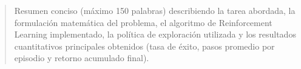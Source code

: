 \begin{abstract}
    Resumen conciso (máximo 150 palabras) describiendo la tarea abordada, la formulación matemática del problema, el algoritmo de Reinforcement Learning implementado, la política de exploración utilizada y los resultados cuantitativos principales obtenidos (tasa de éxito, pasos promedio por episodio y retorno acumulado final).
\end{abstract}